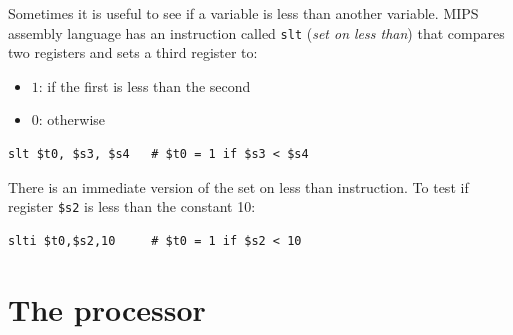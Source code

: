 \documentclass[10pt,a4paper]{article}
\begin{document}
Sometimes it is useful to see if a variable is less than another variable. MIPS assembly language
has an instruction called \texttt{slt} (\textit{set on less than}) that compares two registers and sets a third register to:
\begin{itemize}
    \item $1$: if the first is less than the second
    \item $0$: otherwise
\end{itemize} 
\begin{lstlisting}[numbers=none]
    slt $t0, $s3, $s4   # $t0 = 1 if $s3 < $s4
\end{lstlisting}
There is an immediate version of the set on less than instruction. To test if register \texttt{\$s2} is less than the constant 
10:
\begin{lstlisting}[numbers=none]
    slti $t0,$s2,10     # $t0 = 1 if $s2 < 10
\end{lstlisting}

\section{The processor}




\end{document}
